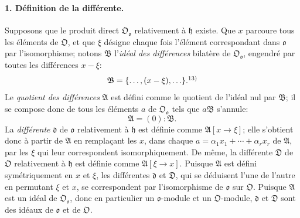 \paragraph{1. Définition de la différente.}
Supposons que le produit direct \(\mathfrak O_{\mathfrak o}\) relativement à \(\mathfrak h\) existe. Que \(x\) parcoure tous les éléments de \(\mathfrak O\), et que \(\xi\) désigne chaque fois l'élément correspondant dans \(\mathfrak o\) par l'isomorphisme; notons \(\mathfrak B\) l'\emph{idéal des différences} bilatère de \(\mathfrak O_{\mathfrak o}\), engendré par toutes les différences \(x-\xi\):
\[
\mathfrak B=\{\ldots,(x-\xi),\ldots\}.\srcfnmark{13)}
\]
Le \emph{quotient des différences} \(\mathfrak A\) est défini comme le quotient de l'idéal nul par \(\mathfrak B\); il se compose donc de tous les éléments \(a\) de \(\mathfrak O_{\mathfrak o}\) tels que \(a\mathfrak B\) s'annule:
\[
\mathfrak A=(0):\mathfrak B.
\]
La \emph{différente} \(\mathfrak d\) de \(\mathfrak o\) relativement à \(\mathfrak h\) est définie comme \(\mathfrak A[x\to\xi]\); elle s'obtient donc à partir de \(\mathfrak A\) en remplaçant les \(x\), dans chaque \(a=\alpha_1x_1+\cdots+\alpha_rx_r\) de \(\mathfrak A\), par les \(\xi\) qui leur correspondent isomorphiquement. De même, la différente \(\mathfrak D\) de \(\mathfrak O\) relativement à \(\mathfrak h\) est définie comme \(\mathfrak A[\xi\to x]\). Puisque \(\mathfrak A\) est défini symétriquement en \(x\) et \(\xi\), les différentes \(\mathfrak d\) et \(\mathfrak D\), qui se déduisent l'une de l'autre en permutant \(\xi\) et \(x\), se correspondent par l'isomorphisme de \(\mathfrak o\) sur \(\mathfrak O\). Puisque \(\mathfrak A\) est un idéal de \(\mathfrak O_{\mathfrak o}\), donc en particulier un \(\mathfrak o\)-module et un \(\mathfrak O\)-module, \(\mathfrak d\) et \(\mathfrak D\) sont des idéaux de \(\mathfrak o\) et de \(\mathfrak O\).

